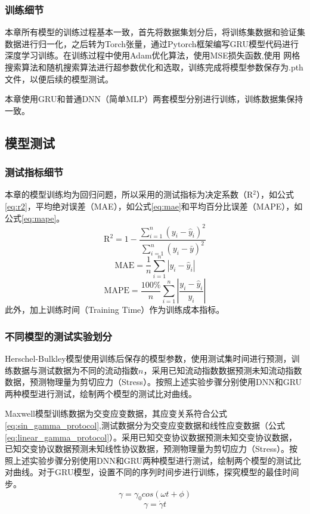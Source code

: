 \subsubsection{训练细节}
本章所有模型的训练过程基本一致，首先将数据集划分后，将训练集数据和验证集数据进行归一化，之后转为Torch张量，通过Pytorch框架编写GRU模型代码进行深度学习训练。在训练过程中使用Adam优化算法，使用MSE损失函数,使用
网格搜索算法和随机搜索算法进行超参数优化和选取，训练完成将模型参数保存为.pth文件，以便后续的模型测试。

本章使用GRU和普通DNN（简单MLP）两套模型分别进行训练，训练数据集保持一致。
\subsection{模型测试}
\subsubsection{测试指标细节}
本章的模型训练均为回归问题，所以采用的测试指标为决定系数（R$^2$），如公式\eqref{eq:r2}，平均绝对误差（MAE），如公式\eqref{eq:mae}和平均百分比误差（MAPE），如公式\eqref{eq:mape}。
\begin{equation}
  \text{R}^2 = 1 - \frac{\sum_{i=1}^{n} (y_i - \hat{y}_i)^2}{\sum_{i=1}^{n} (y_i - \bar{y})^2} \label{eq:r2}
\end{equation}
\begin{equation}
  \text{MAE} = \frac{1}{n} \sum_{i=1}^{n} |y_i - \hat{y}_i| \label{eq:mae}
\end{equation}
\begin{equation}
  \text{MAPE} = \frac{100\%}{n} \sum_{i=1}^{n} \left| \frac{y_i - \hat{y}_i}{y_i} \right| \label{eq:mape}
\end{equation}
此外，加上训练时间（Training Time）作为训练成本指标。
\subsubsection{不同模型的测试实验划分}
Herschel-Bulkley模型使用训练后保存的模型参数，使用测试集时间进行预测，训练数据与测试数据为不同的流动指数$n$，采用已知流动指数数据预测未知流动指数数据，预测物理量为剪切应力（Stress）。按照上述实验步骤分别使用DNN和GRU两种模型进行测试，绘制两个模型的测试比对曲线。

Maxwell模型训练数据为交变应变数据，其应变关系符合公式\eqref{eq:sin_gamma_protocol},测试数据分为交变应变数据和线性应变数据（公式\eqref{eq:linear_gamma_protocol}）。采用已知交变协议数据预测未知交变协议数据，已知交变协议数据预测未知线性协议数据，预测物理量为剪切应力（Stress）。按照上述实验步骤分别使用DNN和GRU两种模型进行测试，绘制两个模型的测试比对曲线。对于GRU模型，设置不同的序列时间步进行训练，探究模型的最佳时间步。
\begin{equation}
  \gamma=\gamma_0cos(\omega t+\phi) \label{eq:sin_gamma_protocol}
\end{equation}
\begin{equation}
  \gamma=\dot{\gamma}t \label{eq:linear_gamma_protocol}
\end{equation}

